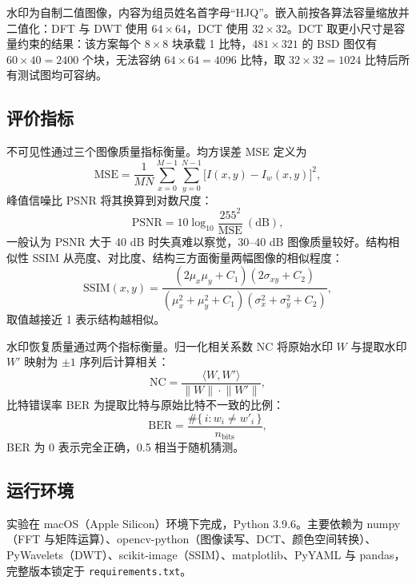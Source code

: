 \documentclass[11pt]{ctexart}
\begin{document}
水印为自制二值图像，内容为组员姓名首字母“HJQ”。嵌入前按各算法容量缩放并二值化：DFT 与 DWT 使用 $64\times64$，DCT 使用 $32\times32$。DCT 取更小尺寸是容量约束的结果：该方案每个 $8\times8$ 块承载 1 比特，$481\times321$ 的 BSD 图仅有 $60\times40=2400$ 个块，无法容纳 $64\times64=4096$ 比特，取 $32\times32=1024$ 比特后所有测试图均可容纳。

\subsection{评价指标}

不可见性通过三个图像质量指标衡量。均方误差 MSE 定义为
\begin{equation}
  \mathrm{MSE} = \frac{1}{MN}\sum_{x=0}^{M-1}\sum_{y=0}^{N-1}\bigl[I(x,y)-I_w(x,y)\bigr]^2,
  \label{eq:mse}
\end{equation}
峰值信噪比 PSNR 将其换算到对数尺度：
\begin{equation}
  \mathrm{PSNR} = 10\log_{10}\frac{255^2}{\mathrm{MSE}}\ (\mathrm{dB}),
  \label{eq:psnr}
\end{equation}
一般认为 PSNR 大于 40 dB 时失真难以察觉，30--40 dB 图像质量较好。结构相似性 SSIM 从亮度、对比度、结构三方面衡量两幅图像的相似程度：
\begin{equation}
  \mathrm{SSIM}(x,y) = \frac{(2\mu_x\mu_y + C_1)(2\sigma_{xy} + C_2)}{(\mu_x^2+\mu_y^2+C_1)(\sigma_x^2+\sigma_y^2+C_2)},
  \label{eq:ssim}
\end{equation}
取值越接近 1 表示结构越相似。

水印恢复质量通过两个指标衡量。归一化相关系数 NC 将原始水印 $W$ 与提取水印 $W'$ 映射为 $\pm1$ 序列后计算相关：
\begin{equation}
  \mathrm{NC} = \frac{\langle W, W'\rangle}{\lVert W\rVert\cdot\lVert W'\rVert},
  \label{eq:nc}
\end{equation}
比特错误率 BER 为提取比特与原始比特不一致的比例：
\begin{equation}
  \mathrm{BER} = \frac{\#\{\,i : w_i \ne w'_i\,\}}{n_{\mathrm{bits}}},
  \label{eq:ber}
\end{equation}
BER 为 0 表示完全正确，0.5 相当于随机猜测。

\subsection{运行环境}

实验在 macOS（Apple Silicon）环境下完成，Python 3.9.6。主要依赖为 numpy（FFT 与矩阵运算）、opencv-python（图像读写、DCT、颜色空间转换）、PyWavelets（DWT）、scikit-image（SSIM）、matplotlib、PyYAML 与 pandas，完整版本锁定于 \texttt{requirements.txt}。
\end{document}
